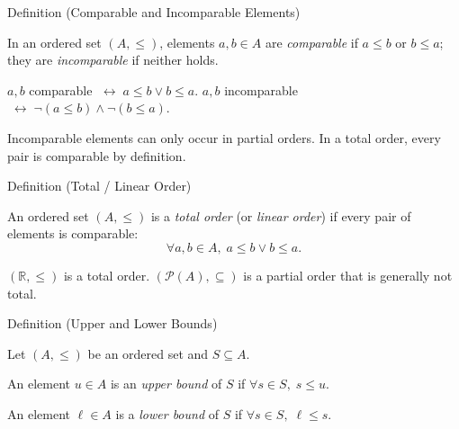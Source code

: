 \begin{definitionbox}{Definition (Comparable and Incomparable Elements)}
\begin{definition}\label{def:comparable}
In an ordered set $(A,\leq)$, elements $a,b \in A$ are \emph{comparable} if
$a \leq b$ or $b \leq a$; they are \emph{incomparable} if neither holds.
\end{definition}
\end{definitionbox}

\NoLocalDependencies

\begin{remark*}
$a,b$ comparable $\;\leftrightarrow\; a \leq b \vee b \leq a$. \quad
$a,b$ incomparable $\;\leftrightarrow\; \neg(a \leq b) \wedge \neg(b \leq a)$.
\end{remark*}

\begin{remark*}
Incomparable elements can only occur in partial orders. In a total order,
every pair is comparable by definition.
\end{remark*}

\begin{definitionbox}{Definition (Total / Linear Order)}
\begin{definition}\label{def:linear-order}
An ordered set $(A,\leq)$ is a \emph{total order} (or \emph{linear order})
if every pair of elements is comparable:
\[
\forall a,b \in A,\; a \leq b \lor b \leq a.
\]
\end{definition}
\end{definitionbox}

\begin{remark*}[Examples]
$(\mathbb{R},\leq)$ is a total order. $(\mathcal{P}(A), \subseteq)$ is a
partial order that is generally not total.
\end{remark*}

\begin{definitionbox}{Definition (Upper and Lower Bounds)}
\begin{definition}\label{def:bounds}
Let $(A,\leq)$ be an ordered set and $S \subseteq A$.

An element $u \in A$ is an \emph{upper bound} of $S$ if $\forall s \in S,\; s \leq u$.

An element $\ell \in A$ is a \emph{lower bound} of $S$ if $\forall s \in S,\; \ell \leq s$.
\end{definition}
\end{definitionbox}

